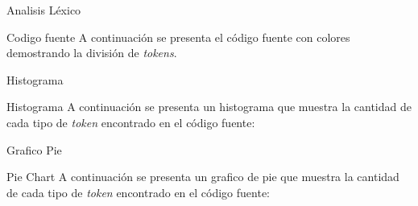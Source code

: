 \documentclass[10pt,xcolor={x11names}]{beamer}
\begin{document}
\begin{frame}{Analisis Léxico}
        \begin{alertblock}{Codigo fuente}
            A continuación se presenta el código fuente con colores demostrando la división de \textit{tokens}.
            \end{alertblock}
\end{frame}


\begin{frame}{Histograma}
        \begin{alertblock}{Histograma}
            A continuación se presenta un histograma que muestra la cantidad de cada tipo de \textit{token} encontrado en el código fuente:
            \end{alertblock}
\end{frame}


\begin{frame}{Grafico Pie}
        \begin{alertblock}{Pie Chart}
            A continuación se presenta un grafico de pie que muestra la cantidad de cada tipo de \textit{token} encontrado en el código fuente:
            \end{alertblock}
\end{frame}
\end{document}
